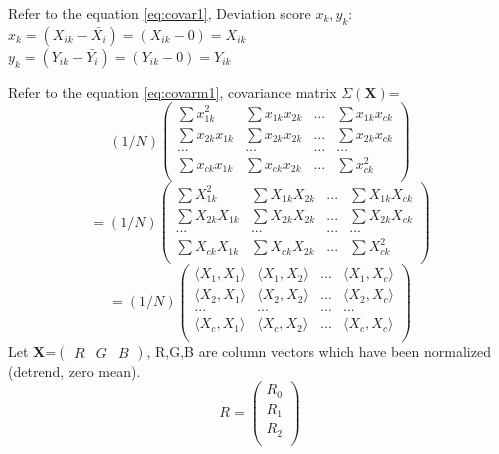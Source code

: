 \documentclass[a4paper,12pt]{article}
\begin{document}
\begin{compactitem}
Refer to the equation \eqref{eq:covar1}, Deviation score $x_k, y_k$:\\
$x_{k}=(X_{ik}-\bar{X_i})=(X_{ik} - 0)= X_{ik}$ \\
$y_{k}=(Y_{ik}-\bar{Y_i})=(Y_{ik} - 0) = Y_{ik}$


Refer to the equation \eqref{eq:covarm1}, covariance matrix $\Sigma(\textbf{X})$=
\[
(1/N)
\begin{pmatrix}
       \sum x_{1k}^{2} 	& \sum x_{1k} x_{2k} 	& ...	& \sum x_{1k} x_{ck}	\\[0.3em]
       \sum x_{2k} x_{1k} 	& \sum x_{2k} x_{2k} 	& ...	& \sum x_{2k} x_{ck}	\\[0.3em]
       ...		& ...			& ...	&	...		\\[0.3em]
       \sum x_{ck} x_{1k} 	& \sum x_{ck} x_{2k} 	& ...	& \sum x_{ck}^{2}	\\[0.3em]
\end{pmatrix}
\]
\[
=(1/N)
\begin{pmatrix}
       \sum X_{1k}^{2} 	& \sum X_{1k} X_{2k} 	& ...	& \sum X_{1k} X_{ck}	\\[0.3em]
       \sum X_{2k} X_{1k} 	& \sum X_{2k} X_{2k} 	& ...	& \sum X_{2k} X_{ck}	\\[0.3em]
       ...		& ...			& ...	&	...		\\[0.3em]
       \sum X_{ck} X_{1k} 	& \sum X_{ck} X_{2k} 	& ...	& \sum X_{ck}^{2}	\\[0.3em]
\end{pmatrix}
\]
\[
=(1/N)
\begin{pmatrix}
       \langle X_1, X_1 \rangle	& \langle X_1, X_2 \rangle 	& ...	& \langle X_1, X_c	\rangle \\[0.3em]
       \langle X_2, X_1 \rangle 	& \langle X_2, X_2 \rangle	& ...	& \langle X_2, X_c	\rangle \\[0.3em]
       ...		& ...			& ...	&	...		\\[0.3em]
       \langle X_c, X_1 \rangle	& \langle X_c, X_2 \rangle 	& ...	& \langle X_c, X_c\rangle	\\[0.3em]
\end{pmatrix}
\]
Let \textbf{X}=$\begin{pmatrix} R & G & B \end{pmatrix}$, R,G,B are column vectors which have been normalized (detrend, zero mean).
\[
R=
\begin{pmatrix}
       R_0\\[0.3em]
       R_1\\[0.3em]
       R_2\\[0.3em]

\end{pmatrix}\]
\end{compactitem}
\end{document}
